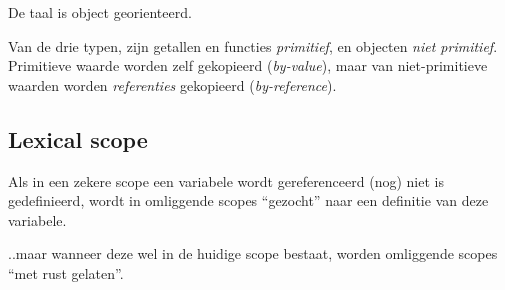 \newCodeFragment
{}

De taal is object georienteerd.

\newCodeFragment
{}

Van de drie typen, zijn getallen en functies \emph{primitief}, en objecten \emph{niet primitief}. Primitieve waarde worden zelf gekopieerd (\emph{by-value}), maar van niet-primitieve waarden worden \emph{referenties} gekopieerd (\emph{by-reference}).

\newCodeFragment
{}

\subsection{Lexical scope}

Als in een zekere scope een variabele wordt gereferenceerd (nog) niet is gedefinieerd, wordt in omliggende scopes ``gezocht'' naar een definitie van deze variabele.



..maar wanneer deze wel in de huidige scope bestaat, worden omliggende scopes ``met rust gelaten''.

\newCodeFragment

